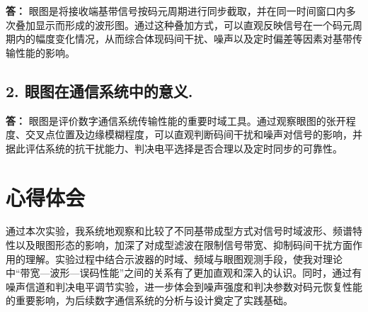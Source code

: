 \documentclass{xjtureport}
\begin{document}
\textbf{答：} 眼图是将接收端基带信号按码元周期进行同步截取，并在同一时间窗口内多次叠加显示而形成的波形图。通过这种叠加方式，可以直观反映信号在一个码元周期内的幅度变化情况，从而综合体现码间干扰、噪声以及定时偏差等因素对基带传输性能的影响。

\subsection*{2. 眼图在通信系统中的意义.}

\textbf{答：}
眼图是评价数字通信系统传输性能的重要时域工具。通过观察眼图的张开程度、交叉点位置及边缘模糊程度，可以直观判断码间干扰和噪声对信号的影响，并据此评估系统的抗干扰能力、判决电平选择是否合理以及定时同步的可靠性。


\section{心得体会}

通过本次实验，我系统地观察和比较了不同基带成型方式对信号时域波形、频谱特性以及眼图形态的影响，加深了对成型滤波在限制信号带宽、抑制码间干扰方面作用的理解。实验过程中结合示波器的时域、频域与眼图观测手段，使我对理论中“带宽—波形—误码性能”之间的关系有了更加直观和深入的认识。同时，通过有噪声信道和判决电平调节实验，进一步体会到噪声强度和判决参数对码元恢复性能的重要影响，为后续数字通信系统的分析与设计奠定了实践基础。
\end{document}
